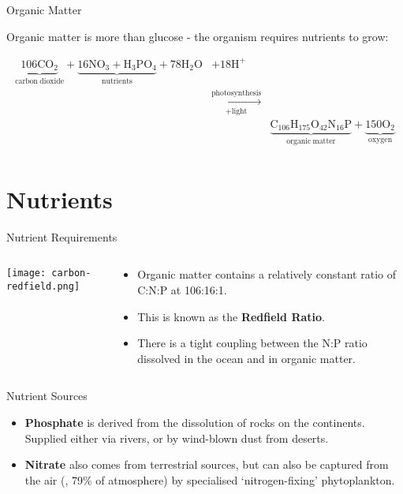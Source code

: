 \begin{frame}{Organic Matter}

    \centering
    Organic matter is more than glucose - the organism requires nutrients to grow:

    \begin{align*}
    \mathrm{\underbrace{106 CO_2}_{carbon~dioxide} + \underbrace{16 NO_3 + H_3PO_4}_{nutrients} + 78 H_2O} &+ \mathrm{18H^+} & \\
    & \mathrm{ \xrightarrow[+light]{photosynthesis}} & \\
    && \mathrm{\underbrace{C_{106}H_{175}O_{42}N_{16}P}_{organic~matter} + \underbrace{150 O_2}_{oxygen}} \\
    \end{align*}


\end{frame}
 
\section{Nutrients}

\begin{frame}{Nutrient Requirements}
    \begin{columns}
        \begin{column}{0.4\linewidth}
            \texttt{[image: carbon-redfield.png]}
        \end{column}
        \begin{column}{0.5\linewidth}
            \begin{itemize}
                \item Organic matter contains a relatively constant ratio of C:N:P at 106:16:1.
                \item This is known as the \textbf{Redfield Ratio}.
                \item There is a tight coupling between the N:P ratio dissolved in the ocean and in organic matter.
            \end{itemize}
        \end{column}
    \end{columns}
\end{frame}

\begin{frame}{Nutrient Sources}
    \begin{itemize}
        \item \textbf{Phosphate} is derived from the dissolution of rocks on the continents. Supplied either via rivers, or by wind-blown dust from deserts.
        \item \textbf{Nitrate} also comes from terrestrial sources, but can also be captured from the air (, 79\% of atmosphere) by specialised `nitrogen-fixing' phytoplankton.
    \end{itemize} 
\end{frame}

